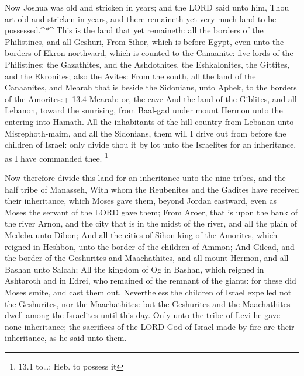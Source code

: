  Now Joshua was old and stricken in years; and the LORD said
unto him, Thou art old and stricken in years, and there remaineth yet
very much land to be possessed.\^{}*\^{}  This is the land
that yet remaineth: all the borders of the Philistines, and all Geshuri,
 From Sihor, which is before Egypt, even unto the borders of
Ekron northward, which is counted to the Canaanite: five lords of the
Philistines; the Gazathites, and the Ashdothites, the Eshkalonites, the
Gittites, and the Ekronites; also the Avites:  From the
south, all the land of the Canaanites, and Mearah that is beside the
Sidonians, unto Aphek, to the borders of the Amorites:+ 13.4 Mearah: or,
the cave  And the land of the Giblites, and all Lebanon,
toward the sunrising, from Baal-gad under mount Hermon unto the entering
into Hamath.  All the inhabitants of the hill country from
Lebanon unto Misrephoth-maim, and all the Sidonians, them will I drive
out from before the children of Israel: only divide thou it by lot unto
the Israelites for an inheritance, as I have commanded thee. \footnote{13.1
  to\ldots: Heb. to possess it}

 Now therefore divide this land for an inheritance unto the
nine tribes, and the half tribe of Manasseh,  With whom the
Reubenites and the Gadites have received their inheritance, which Moses
gave them, beyond Jordan eastward, even as Moses the servant of the LORD
gave them;  From Aroer, that is upon the bank of the river
Arnon, and the city that is in the midst of the river, and all the plain
of Medeba unto Dibon;  And all the cities of Sihon king of
the Amorites, which reigned in Heshbon, unto the border of the children
of Ammon;  And Gilead, and the border of the Geshurites and
Maachathites, and all mount Hermon, and all Bashan unto Salcah;
 All the kingdom of Og in Bashan, which reigned in
Ashtaroth and in Edrei, who remained of the remnant of the giants: for
these did Moses smite, and cast them out.  Nevertheless the
children of Israel expelled not the Geshurites, nor the Maachathites:
but the Geshurites and the Maachathites dwell among the Israelites until
this day.  Only unto the tribe of Levi he gave none
inheritance; the sacrifices of the LORD God of Israel made by fire are
their inheritance, as he said unto them.

